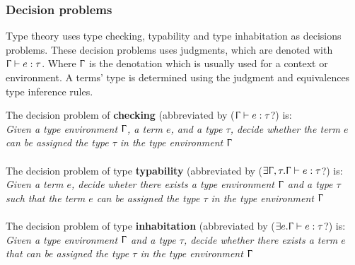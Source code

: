 \subsubsection{Decision problems}
Type theory uses type checking, typability and type inhabitation as decisions problems. These decision problems uses judgments, which are denoted with $\Upgamma \vdash e:\tau$. Where $\Upgamma$ is the denotation which is usually used for a context or environment. A terms' type is determined using the judgment and equivalences type inference rules. 

\para
The decision problem of \textbf{checking} (abbreviated by ($\Upgamma\vdash e : \tau$?) is:\\
\textit{Given a type environment $\Upgamma$, a term $e$, and a type $\tau$, decide whether the term $e$ can be assigned the type $\tau$ in the type environment $\Upgamma$} \\ \\
The decision problem of type \textbf{typability} (abbreviated by ($ \exists \Upgamma,\tau .\Upgamma\vdash e : \tau$?) is: \\ 
\textit{Given  a term $e$, decide wheter there exists a type environment $\Upgamma$ and a type $\tau$ such that the term $e$ can be assigned the type $\tau$ in the type environment $\Upgamma$} \\ \\ 
The decision problem of type \textbf{inhabitation} (abbreviated by ($ \exists e.\Upgamma \vdash e : \tau$?) is: \\
\textit{Given a type environment $\Upgamma$ and a type $\tau$, decide whether there exists a term $e$ that can be assigned the type $\tau$ in the type environment $\Upgamma$}

